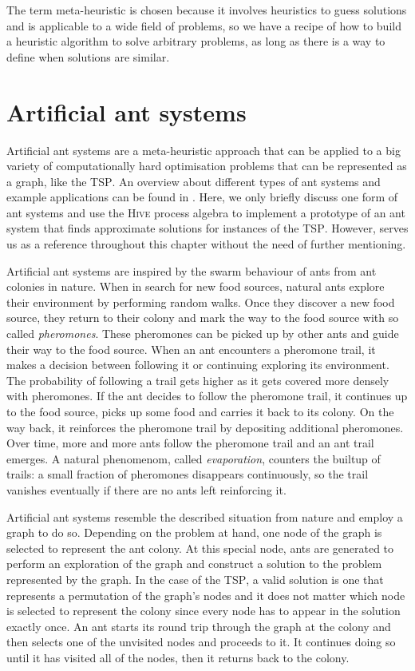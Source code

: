 The term meta-heuristic is chosen because it involves heuristics to guess solutions and is applicable to a wide field of problems, so we have a recipe of how to build a heuristic algorithm to solve arbitrary problems, as long as there is a way to define when solutions are similar.

\section{Artificial ant systems}
\label{chp:ant_system}
Artificial ant systems are a meta-heuristic approach that can be applied to a big variety of computationally hard optimisation problems that can be represented as a graph, like the \textsc{TSP}. An overview about different types of ant systems and example applications can be found in \cite{Dorigo:2004:ACO:975277}. Here, we only briefly discuss one form of ant systems and use the \textsc{Hive} process algebra to implement a prototype of an ant system that finds approximate solutions for instances of the \textsc{TSP}. However, \cite{Dorigo:2004:ACO:975277} serves us as a reference throughout this chapter without the need of further mentioning.

Artificial ant systems are inspired by the swarm behaviour of ants from ant colonies in nature. When in search for new food sources, natural ants explore their environment by performing random walks. Once they discover a new food source, they return to their colony and mark the way to the food source with so called \textit{pheromones}. These pheromones can be picked up by other ants and guide their way to the food source. When an ant encounters a pheromone trail, it makes a decision between following it or continuing exploring its environment. The probability of following a trail gets higher as it gets covered more densely with pheromones. If the ant decides to follow the pheromone trail, it continues up to the food source, picks up some food and carries it back to its colony. On the way back, it reinforces the pheromone trail by depositing additional pheromones. Over time, more and more ants follow the pheromone trail and an ant trail emerges. A natural phenomenom, called \textit{evaporation}, counters the builtup of trails: a small fraction of pheromones disappears continuously, so the trail vanishes eventually if there are no ants left reinforcing it.

Artificial ant systems resemble the described situation from nature and employ a graph to do so. Depending on the problem at hand, one node of the graph is selected to represent the ant colony. At this special node, ants are generated to perform an exploration of the graph and construct a solution to the problem represented by the graph. In the case of the \textsc{TSP}, a valid solution is one that represents a permutation of the graph's nodes and it does not matter which node is selected to represent the colony since every node has to appear in the solution exactly once. An ant starts its round trip through the graph at the colony and then selects one of the unvisited nodes and proceeds to it. It continues doing so until it has visited all of the nodes, then it returns back to the colony.

